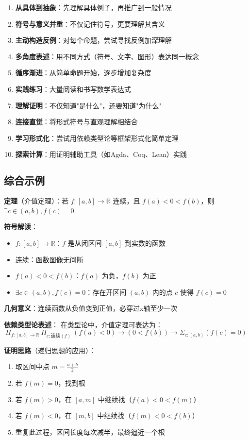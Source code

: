 \documentclass[12pt,a4paper,UTF8]{ctexart}
\begin{document}
\begin{enumerate}
    \item \textbf{从具体到抽象}：先理解具体例子，再推广到一般情况
    \item \textbf{符号与意义并重}：不仅记住符号，更要理解其含义
    \item \textbf{主动构造反例}：对每个命题，尝试寻找反例加深理解
    \item \textbf{多角度表述}：用不同方式（符号、文字、图形）表达同一概念
    \item \textbf{循序渐进}：从简单命题开始，逐步增加复杂度
    \item \textbf{实践练习}：大量阅读和书写数学表达式
    \item \textbf{理解证明}：不仅知道"是什么"，还要知道"为什么"
    \item \textbf{连接直觉}：将形式符号与直观理解相结合
    \item \textbf{学习形式化}：尝试用依赖类型论等框架形式化简单定理
    \item \textbf{探索计算}：用证明辅助工具（如Agda、Coq、Lean）实践
\end{enumerate}

\subsection{综合示例}

\textbf{定理}（介值定理）：若 $f:[a,b] \to \mathbb{R}$ 连续，且 $f(a) < 0 < f(b)$，则 $\exists c \in (a,b), f(c) = 0$

\textbf{符号解读}：
\begin{itemize}
    \item $f:[a,b] \to \mathbb{R}$：$f$ 是从闭区间 $[a,b]$ 到实数的函数
    \item 连续：函数图像无间断
    \item $f(a) < 0 < f(b)$：$f(a)$ 为负，$f(b)$ 为正
    \item $\exists c \in (a,b), f(c) = 0$：存在开区间 $(a,b)$ 内的点 $c$ 使得 $f(c)=0$
\end{itemize}

\textbf{几何意义}：连续函数从负值变到正值，必穿过x轴至少一次

\textbf{依赖类型论表述}：
在类型论中，介值定理可表达为：
$$\Pi_{f:[a,b]\to\mathbb{R}}\ \Pi_{c:\text{连续}(f)}\ (f(a)<0) \to (0<f(b)) \to \Sigma_{c:(a,b)} (f(c)=0)$$

\textbf{证明思路}（递归思想的应用）：
\begin{enumerate}
    \item 取区间中点 $m = \frac{a+b}{2}$
    \item 若 $f(m)=0$，找到根
    \item 若 $f(m)>0$，在 $[a,m]$ 中继续找（$f(a)<0<f(m)$）
    \item 若 $f(m)<0$，在 $[m,b]$ 中继续找（$f(m)<0<f(b)$）
    \item 重复此过程，区间长度每次减半，最终逼近一个根
\end{enumerate}
\end{document}
